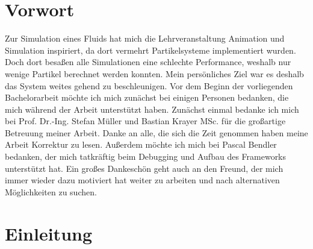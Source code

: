 \documentclass[intern,palatino]{cgBA}
\begin{document}

\section{Vorwort}\label{vorwort}

Zur Simulation eines Fluids hat mich die Lehrveranstaltung Animation und Simulation inspiriert, da dort vermehrt Partikelsysteme implementiert wurden. Doch dort besaßen alle Simulationen eine schlechte Performance, weshalb nur wenige Partikel berechnet werden konnten. Mein persönliches Ziel war es deshalb das System weites gehend zu beschleunigen.
\newline \newline
Vor dem Beginn der vorliegenden Bachelorarbeit möchte ich mich zunächst bei einigen Personen bedanken, die mich während der Arbeit unterstützt haben.
\newline \newline
Zunächst einmal bedanke ich mich bei Prof. Dr.-Ing. Stefan Müller und Bastian Krayer MSc. für die großartige Betreuung meiner Arbeit.
\newline
Danke  an alle, die sich die Zeit genommen haben meine Arbeit Korrektur zu lesen.
\newline
Außerdem möchte ich mich bei Pascal Bendler bedanken, der mich tatkräftig beim Debugging und Aufbau des Frameworks unterstützt hat.
\newline
Ein großes Dankeschön geht auch an den Freund, der mich immer wieder dazu motiviert hat weiter zu arbeiten und nach alternativen Möglichkeiten zu suchen.
\newpage


\section{Einleitung}\label{einleitung}
\end{document}

